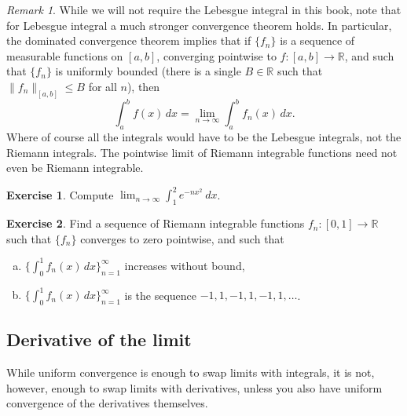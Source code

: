 \documentclass[12pt,openany]{book}
\newcommand{\snorm}[1]{\lVert {#1} \rVert}
\newcommand{\R}{{\mathbb{R}}}
\theoremstyle{plain}
\theoremstyle{remark}
\newtheorem{remark}[thm]{Remark}
\theoremstyle{definition}
\newenvironment{exbox}{%
    \def\FrameCommand{\vrule width 1pt \relax\hspace {10pt}}%
    \MakeFramed {\advance \hsize -\width \FrameRestore }%
}{%
    \endMakeFramed
}
\newenvironment{exparts}{%
    \leavevmode\begin{enumerate}[a),noitemsep,topsep=0pt,parsep=0pt,partopsep=0pt]
}{%
    \end{enumerate}
}
\theoremstyle{exercise}
\newtheorem{exercise}{Exercise}[section]
\theoremstyle{example}
\begin{document}
\begin{remark}
While we will not require the Lebesgue integral in this book, note that
for Lebesgue integral a much stronger convergence theorem holds.  In
particular, the dominated convergence theorem implies that if
$\{ f_n \}$ is a sequence of measurable functions on $[a,b]$,
converging pointwise to $f \colon [a,b] \to \R$, and such that
$\{ f_n \}$ is uniformly bounded (there is a single $B \in \R$ such that
$\snorm{f_n}_{[a,b]} \leq B$ for all $n$), then
\begin{equation*}
\int_a^b f(x) \, dx = \lim_{n\to\infty} \int_a^b f_n(x) \, dx .
\end{equation*}
Where of course all the integrals would have to be the Lebesgue integrals,
not the Riemann integrals.  The pointwise limit of Riemann integrable
functions need not even be Riemann integrable.
\end{remark}

\begin{exbox}
\begin{exercise}
Compute
$\displaystyle \lim_{n\to\infty} \int_1^2 e^{-nx^2} ~dx$.
\end{exercise}

\begin{exercise}
Find a sequence of Riemann integrable functions $f_n \colon [0,1] \to \R$ such
that $\{ f_n \}$ converges to zero pointwise, and such that
\begin{exparts}
\item
$\bigl\{ \int_0^1 f_n(x)\,dx \bigr\}_{n=1}^\infty$ increases without bound,
\item
$\bigl\{ \int_0^1 f_n(x)\,dx \bigr\}_{n=1}^\infty$ is the sequence $-1,1,-1,1,-1,1, \ldots$.
\end{exparts}
\end{exercise}
\end{exbox}

\subsection{Derivative of the limit}

While uniform convergence is enough to swap limits with integrals, it is not,
however, enough to swap limits with derivatives, unless you also have
uniform convergence of the derivatives themselves.
\end{document}
